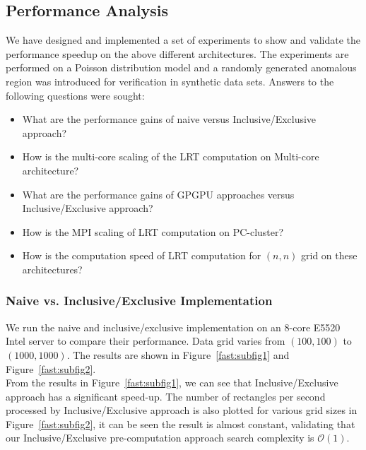 \documentclass[AMA,LATO1COL]{WileyNJD-v2}
\newcommand\bigo{\mathcal O}
\begin{document}
\subsection{Performance Analysis}
We have designed and implemented a set of experiments to show and validate the performance speedup on the above different architectures. The experiments are performed on a Poisson distribution model and a randomly generated anomalous region was introduced
for verification in synthetic data sets. Answers to the following questions were sought:
\begin{itemize}
\item What are the performance gains of naive versus Inclusive/Exclusive
 approach?
\item How is the multi-core scaling of the LRT computation on Multi-core architecture?
\item What are the performance gains of GPGPU approaches versus Inclusive/Exclusive approach?
\item How is the MPI scaling of LRT computation on PC-cluster?
\item How is the computation speed of LRT computation for $(n,n)$ grid on these architectures?
\end{itemize}

\subsubsection{Naive vs. Inclusive/Exclusive Implementation}
 We run the naive and inclusive/exclusive implementation on an 8-core E5520 Intel server to compare their performance. Data grid varies from $(100,100)$ to $(1000,1000)$. The results are shown in Figure~\ref{fast:subfig1} and Figure~\ref{fast:subfig2}.\\
From the results in Figure~\ref{fast:subfig1}, we can see that Inclusive/Exclusive approach has a significant speed-up. The number of rectangles per second processed by Inclusive/Exclusive approach is also plotted for various grid sizes in Figure~\ref{fast:subfig2}, it can be seen the result is almost constant, validating that our Inclusive/Exclusive pre-computation approach search complexity is $\bigo (1)$.
\end{document}
